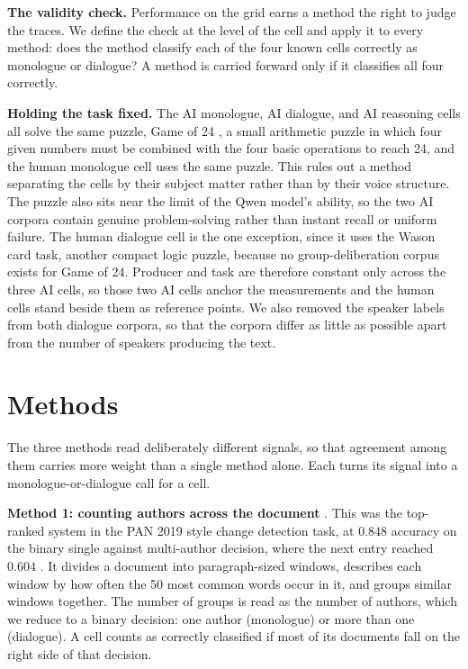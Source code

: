 \documentclass[10pt,twocolumn]{article}
\begin{document}
\textbf{The validity check.} Performance on the grid earns a method the right to judge the traces.
We define the check at the level of the cell and apply it to every method: does the method classify
each of the four known cells correctly as monologue or dialogue? A method is carried forward only if
it classifies all four correctly.

\textbf{Holding the task fixed.} The AI monologue, AI dialogue, and AI reasoning cells all solve the
same puzzle, Game of 24 \cite{yao2023}, a small arithmetic puzzle in which four given numbers must be
combined with the four basic operations to reach 24, and the human monologue cell uses the same
puzzle. This rules out a method separating the cells by their subject matter rather than by their
voice structure. The puzzle also sits near the limit of the Qwen model's ability, so the two AI
corpora contain genuine problem-solving rather than instant recall or uniform failure. The human
dialogue cell is the one exception, since it uses the Wason card task, another compact logic puzzle,
because no group-deliberation corpus exists for Game of 24. Producer and task are therefore constant
only across the three AI cells, so those two AI cells anchor the measurements and the human cells
stand beside them as reference points. We also removed the speaker labels from both dialogue corpora,
so that the corpora differ as little as possible apart from the number of speakers producing the
text.

\section{Methods}
The three methods read deliberately different signals, so that agreement among them carries more
weight than a single method alone. Each turns its signal into a monologue-or-dialogue call for a
cell.

\textbf{Method 1: counting authors across the document} \cite{nath2019}. This was the top-ranked
system in the PAN 2019 style change detection task, at $0.848$ accuracy on the binary single against
multi-author decision, where the next entry reached $0.604$ \cite{zangerle2019}. It divides a
document into paragraph-sized windows, describes each window by how often the 50 most common words
occur in it, and groups similar windows together. The number of groups is read as the number of
authors, which we reduce to a binary decision: one author (monologue) or more than one (dialogue). A
cell counts as correctly classified if most of its documents fall on the right side of that decision.
\end{document}
